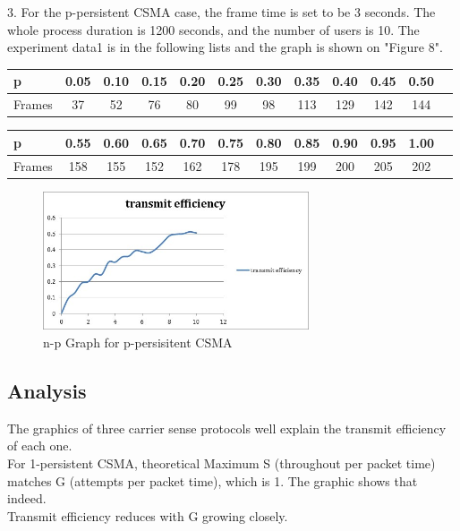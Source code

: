 \documentclass[11pt,a4paper]{report}
\begin{document}
3. For the p-persistent CSMA case, the frame time is set to be 3 seconds. The whole process duration is 1200 seconds, and the number of users is 10. The experiment data1 is in the following lists and the graph is shown on "Figure 8".
\begin{table}[htbp]
\begin{tabular}{lccccccccccc}
\toprule
p & 0.05 & 0.10 & 0.15  & 0.20 & 0.25 & 0.30 & 0.35 & 0.40 & 0.45 & 0.50 \\
\midrule
Frames & 37 & 52 & 76 & 80 & 99 & 98 & 113 & 129 & 142 & 144 \\
\bottomrule
\end{tabular}
\end{table}

\begin{table}[htbp]
\begin{tabular}{lccccccccccc}
\toprule
p & 0.55 & 0.60 & 0.65  & 0.70 & 0.75 & 0.80 & 0.85 & 0.90 & 0.95 & 1.00 \\
\midrule
Frames & 158 & 155 & 152 & 162 & 178 & 195 & 199 & 200 & 205 & 202 \\
\bottomrule
\end{tabular}
\end{table}

\begin{figure}
\centering
\includegraphics[width=0.7\textwidth]{3_4.jpg}
\caption{n-p Graph for p-persisitent CSMA}
\end{figure}

\subsection*{Analysis}
The graphics of three carrier sense protocols well explain the transmit efficiency of each one. \\

For 1-persistent CSMA, theoretical Maximum S (throughout per packet time) matches G (attempts per packet time), which is 1. The graphic shows that indeed. \\
Transmit efficiency reduces with G growing closely. \\
\end{document}
